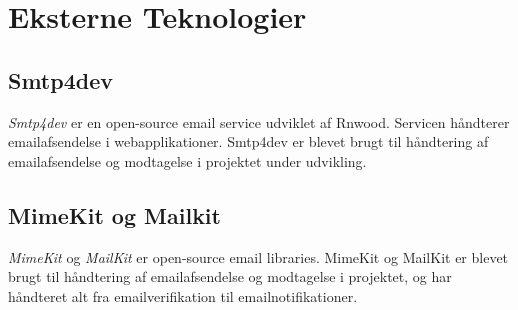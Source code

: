 \section{Eksterne Teknologier}
\subsection{Smtp4dev}
\emph{Smtp4dev} er en open-source email service udviklet af Rnwood. Servicen håndterer emailafsendelse i webapplikationer. Smtp4dev er blevet brugt til håndtering af emailafsendelse og modtagelse i projektet under udvikling.

\subsection{MimeKit og Mailkit}
\emph{MimeKit} og \emph{MailKit} er open-source email libraries. MimeKit og MailKit er blevet brugt til håndtering af emailafsendelse og modtagelse i projektet, og har håndteret alt fra emailverifikation til emailnotifikationer.
